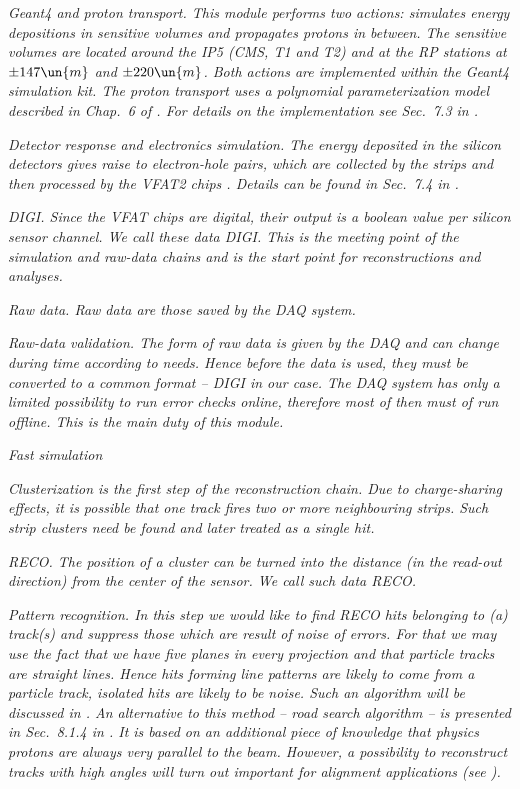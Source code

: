 \em{Geant4 and proton transport}.
This module performs two actions: simulates energy depositions in sensitive volumes and propagates protons in between. The sensitive volumes are located around the IP5 (CMS, T1 and T2) and at the RP stations at $\pm 147\un{m}$ and $\pm 220\un{m}$. Both actions are implemented within the Geant4  simulation kit. The proton transport uses a polynomial parameterization model described in Chap.~6 of . For details on the implementation see Sec.~7.3 in .

\em{Detector response and electronics simulation}. The energy deposited in the silicon detectors gives raise to electron-hole pairs, which are collected by the strips and then processed by the VFAT2 chips . Details can be found in Sec.~7.4 in .

\em{DIGI}.
Since the VFAT chips are digital, their output is a boolean value per silicon sensor channel. We call these data DIGI. This is the meeting point of the simulation and raw-data chains and is the start point for reconstructions and analyses.

\em{Raw data}.
Raw data are those saved by the DAQ system.

\em{Raw-data validation}.
The form of raw data is given by the DAQ and can change during time according to needs. Hence before the data is used, they must be converted to a common format -- DIGI in our case. The DAQ system has only a limited possibility to run error checks online, therefore most of then must of run offline. This is the main duty of this module.

\em{Fast simulation}


\em{Clusterization}
is the first step of the reconstruction chain. Due to charge-sharing effects, it is possible that one track fires two or more neighbouring strips. Such strip clusters need be found and later treated as a single hit.

\em{RECO}.
The position of a cluster can be turned into the distance (in the read-out direction) from the center of the sensor. We call such data RECO.


\em{Pattern recognition}.
In this step we would like to find RECO hits belonging to (a) track(s) and suppress those which are result of noise of errors. For that we may use the fact that we have five planes in every projection and that particle tracks are straight lines. Hence hits forming line patterns are likely to come from a particle track, isolated hits are likely to be noise. Such an algorithm will be discussed in . An alternative to this method -- road search algorithm -- is presented in Sec.~8.1.4 in . It is based on an additional piece of knowledge that physics protons are always very parallel to the beam. However, a possibility to reconstruct tracks with high angles will turn out important for alignment applications (see ). 

